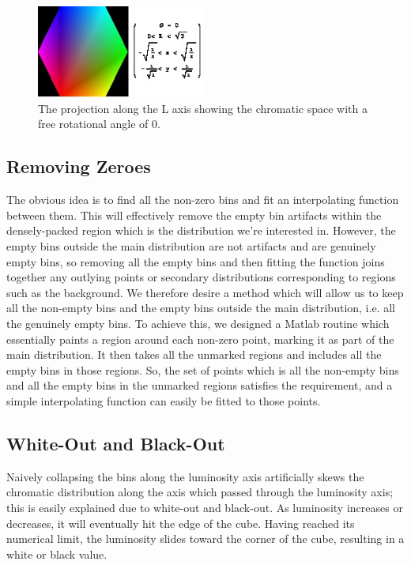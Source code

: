 \begin{figure}[h!]
  \centering
    \includegraphics[width=0.49\textwidth]{Chapter3/Figs/xy_Polygon.jpg}
    \caption{The projection along the L axis showing the chromatic space with a free rotational angle of 0.}  \label{fig:xyPolygon}
\end{figure}



\subsection{Removing Zeroes}\label{sec:RemovingZeroes}

The obvious idea is to find all the non-zero bins and fit an interpolating function between them. This will effectively remove the empty bin artifacts within the densely-packed region which is the distribution we're interested in. However, the empty bins outside the main distribution are not artifacts and are genuinely empty bins, so removing all the empty bins and then fitting the function joins together any outlying points or secondary distributions corresponding to regions such as the background. We therefore desire a method which will allow us to keep all the non-empty bins and the empty bins outside the main distribution, i.e. all the genuinely empty bins. To achieve this, we designed a Matlab routine which essentially paints a region around each non-zero point, marking it as part of the main distribution. It then takes all the unmarked regions and includes all the empty bins in those regions. So, the set of points which is all the non-empty bins and all the empty bins in the unmarked regions satisfies the requirement, and a simple interpolating function can easily be fitted to those points.


\subsection{White-Out and Black-Out}\label{sec:WhiteOutBlackOut}

Naively collapsing the bins along the luminosity axis artificially skews the chromatic distribution along the axis which passed through the luminosity axis; this is easily explained due to white-out and black-out. As luminosity increases or decreases, it will eventually hit the edge of the cube. Having reached its numerical limit, the luminosity slides toward the corner of the cube, resulting in a white or black value.

